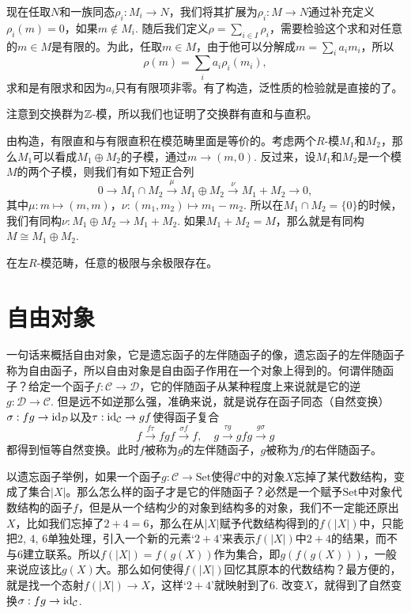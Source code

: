 现在任取$N$和一族同态$\rho_i:M_i\to N$，我们将其扩展为$\rho_i:M\to N$通过补充定义$\rho_i(m)=0$，如果$m\notin M_i$. 随后我们定义$\rho = \sum_{i\in I} \rho_i$，需要检验这个求和对任意的$m\in M$是有限的。为此，任取$m\in M$，由于他可以分解成$m=\sum_i a_i m_i$，所以
\[
	\rho(m)=\sum_i a_i \rho_i(m_i),
\]
求和是有限求和因为$a_i$只有有限项非零。有了构造，泛性质的检验就是直接的了。

注意到交换群为$\mathbb{Z}$-模，所以我们也证明了交换群有直和与直积。

\para 由构造，有限直和与有限直积在模范畴里面是等价的。考虑两个$R$-模$M_1$和$M_2$，那么$M_1$可以看成$M_1\oplus M_2$的子模，通过$m\to (m,0)$. 反过来，设$M_1$和$M_2$是一个模$M$的两个子模，则我们有如下短正合列
\[
	0\to M_1\cap M_2 \xrightarrow{\mu} M_1\oplus M_2\xrightarrow{\nu} M_1+M_2\to 0,
\]
其中$\mu:m\mapsto (m,m)$，$\nu:(m_1,m_2)\mapsto m_1-m_2$. 所以在$M_1\cap M_2=\{0\}$的时候，我们有同构$\nu: M_1\oplus M_2\to M_1+M_2$. 如果$M_1+M_2=M$，那么就是有同构$M\cong M_1\oplus M_2$.

\theo 在左$R$-模范畴，任意的极限与余极限存在。 \notprove

\section{自由对象}

一句话来概括自由对象，它是遗忘函子的左伴随函子的像，遗忘函子的左伴随函子称为自由函子，所以自由对象是自由函子作用在一个对象上得到的。何谓伴随函子？给定一个函子$f:\mathcal{C}\to \mathcal{D}$，它的伴随函子从某种程度上来说就是它的逆$g:\mathcal{D}\to \mathcal{C}$. 但是远不如逆那么强，准确来说，就是说存在函子同态（自然变换）$\sigma:fg\to \operatorname{id}_{\mathcal{D}}$以及$\tau:\operatorname{id}_{\mathcal{C}}\to gf$使得函子复合
\[
	f\xrightarrow{f\tau}fgf\xrightarrow{\sigma f}f,\quad g\xrightarrow{\tau g}gfg\xrightarrow{g\sigma}g
\]
都得到恒等自然变换。此时$f$被称为$g$的左伴随函子，$g$被称为$f$的右伴随函子。

以遗忘函子举例，如果一个函子$g:\mathcal{C}\to \text{Set}$使得$\mathcal{C}$中的对象$X$忘掉了某代数结构，变成了集合$|X|$。那么怎么样的函子才是它的伴随函子？必然是一个赋予$\text{Set}$中对象代数结构的函子$f$，但是从一个结构少的对象到结构多的对象，我们不一定能还原出$X$，比如我们忘掉了$2+4=6$，那么在从$|X|$赋予代数结构得到的$f(|X|)$中，只能把$2$, $4$, $6$单独处理，引入一个新的元素`$2+4$'来表示$f(|X|)$中$2+4$的结果，而不与$6$建立联系。所以$f(|X|)=f(g(X))$作为集合，即$g(f(g(X)))$，一般来说应该比$g(X)$大。那么如何使得$f(|X|)$回忆其原本的代数结构？最方便的，就是找一个态射$f(|X|)\to X$，这样`$2+4$'就映射到了$6$. 改变$X$，就得到了自然变换$\sigma:fg\to \operatorname{id}_\mathcal{C}$.

